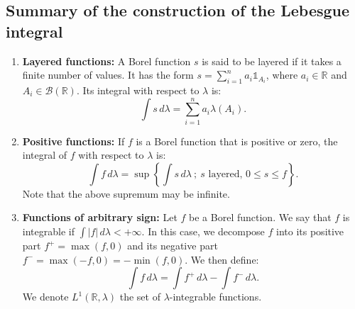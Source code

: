 \subsection*{Summary of the construction of the Lebesgue integral}%
\begin{enumerate}
    \item \textbf{Layered functions:} A Borel function $s$ is said to be layered if it takes a finite number of values. It has the form $s = \sum_{i=1}^n a_i \mathbb{1}_{A_i}$, where $a_i \in \mathbb{R}$ and $A_i \in \mathcal{B}(\mathbb{R})$. Its integral with respect to $\lambda$ is:
    \[ \int s \,d\lambda = \sum_{i=1}^n a_i \lambda(A_i). \]
    \item \textbf{Positive functions:} If $f$ is a Borel function that is positive or zero, the integral of $f$ with respect to $\lambda$ is:
    \[ \int f \,d\lambda = \sup \left\{ \int s \,d\lambda \ ; \ s \text{ layered, } 0 \le s \le f \right\}. \]
    Note that the above supremum may be infinite.
    \item \textbf{Functions of arbitrary sign:} Let $f$ be a Borel function. We say that $f$ is integrable if $\int |f| \,d\lambda < +\infty$.
    In this case, we decompose $f$ into its positive part $f^+ = \max(f,0)$ and its negative part $f^- = \max(-f,0) = -\min(f,0)$. We then define:
    \[ \int f \,d\lambda = \int f^+ \,d\lambda - \int f^- \,d\lambda. \]
    We denote $L^1(\mathbb{R}, \lambda)$ the set of $\lambda$-integrable functions.
\end{enumerate}%

